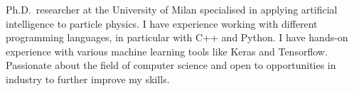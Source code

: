 

\begin{cvparagraph}

Ph.D.\ researcher at the University of Milan specialised in applying artificial intelligence to particle physics.
I have experience working with different programming languages, in particular with C++ and Python.
I have hands-on experience with various machine learning tools like Keras and Tensorflow.
Passionate about the field of computer science and open to opportunities in industry to further improve my skills.
\end{cvparagraph}